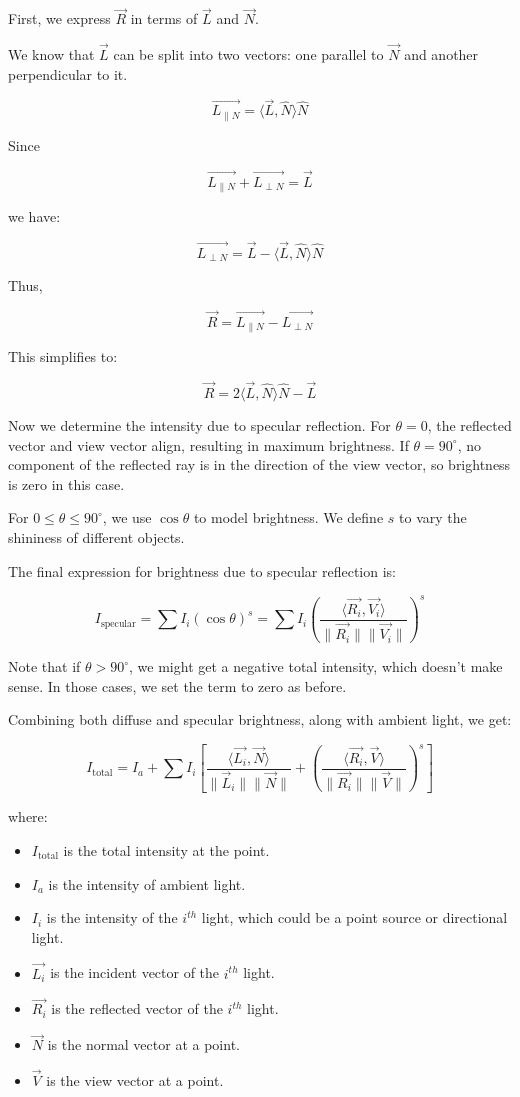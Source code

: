 \documentclass{article}
\begin{document}
First, we express $\vec{R}$ in terms of $\vec{L}$ and $\vec{N}$.

We know that $\vec{L}$ can be split into two vectors: one parallel to $\vec{N}$ and another perpendicular to it.

$$\vec{L_{\| N}} = \langle \vec{L}, \hat{N} \rangle \hat{N}$$

Since 

$$\vec{L_{\| N}} + \vec{L_{\perp N}} = \vec{L}$$

we have:

$$\vec{L_{\perp N}} = \vec{L} - \langle \vec{L}, \hat{N} \rangle \hat{N}$$

Thus,

$$\vec{R} = \vec{L_{\| N}} - \vec{L_{\perp N}}$$

This simplifies to:

$$\vec{R} = 2 \langle \vec{L}, \hat{N} \rangle \hat{N} - \vec{L}$$

Now we determine the intensity due to specular reflection. For $\theta = 0$, the reflected vector and view vector align, resulting in maximum brightness. If $\theta = 90^\circ$, no component of the reflected ray is in the direction of the view vector, so brightness is zero in this case.

For $0 \leq \theta \leq 90^\circ$, we use $\cos \theta$ to model brightness. We define $s$ to vary the shininess of different objects.

The final expression for brightness due to specular reflection is:

$$I_{\text{specular}} = \sum I_i (\cos \theta)^s = \sum I_i \left( \frac{\langle \vec{R_i}, \vec{V_i} \rangle}{\|\vec{R_i}\| \|\vec{V_i}\|} \right)^s$$

Note that if $\theta > 90^\circ$, we might get a negative total intensity, which doesn't make sense. In those cases, we set the term to zero as before.

Combining both diffuse and specular brightness, along with ambient light, we get:

$$I_{\text{total}} = I_a + \sum I_i \left[ \frac{\langle \vec{L_i}, \vec{N} \rangle}{\|\vec{L}_i\| \|\vec{N}\|} + \left( \frac{\langle \vec{R_i}, \vec{V} \rangle}{\|\vec{R_i}\| \|\vec{V}\|} \right)^s \right]$$

where:
\begin{itemize}
    \item $I_{\text{total}}$ is the total intensity at the point.
    \item $I_a$ is the intensity of ambient light.
    \item $I_i$ is the intensity of the $i^{th}$ light, which could be a point source or directional light.
    \item $\vec{L_i}$ is the incident vector of the $i^{th}$ light.
    \item $\vec{R_i}$ is the reflected vector of the $i^{th}$ light.
    \item $\vec{N}$ is the normal vector at a point.
    \item $\vec{V}$ is the view vector at a point.
\end{itemize}
\end{document}
